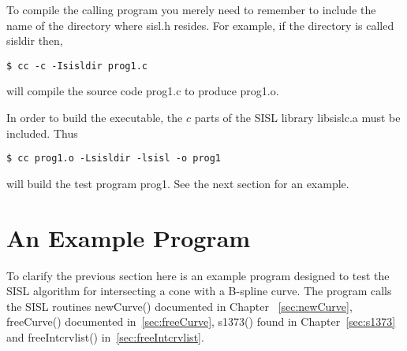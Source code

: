 To compile the calling program you merely need to remember to include
the name of the directory where sisl.h resides.
For example, if the directory is called sisldir then,
\begin{verbatim}
$ cc -c -Isisldir prog1.c
\end{verbatim}
will compile the source code prog1.c to produce prog1.o.

In order to build the executable, the $c$ parts of the
SISL library libsislc.a must be included. Thus
\begin{verbatim}
$ cc prog1.o -Lsisldir -lsisl -o prog1
\end{verbatim}
will build the test program prog1. See the next section for an example.

\newpage
\section{An Example Program}

To clarify the previous section here is an example program designed to
test the SISL algorithm for intersecting a cone with
a B-spline curve. The program calls the SISL routines newCurve() documented in
Chapter ~\ref{sec:newCurve}, freeCurve() documented in~\ref{sec:freeCurve},
s1373() found in Chapter~\ref{sec:s1373} and freeIntcrvlist() in~\ref{sec:freeIntcrvlist}.

